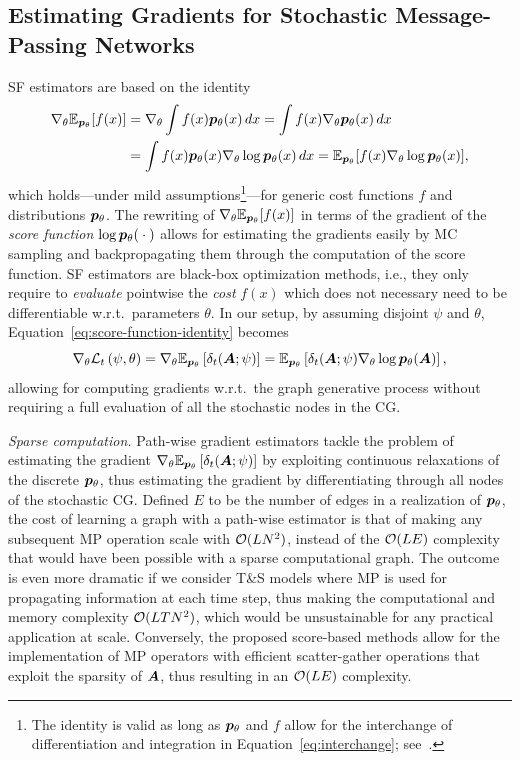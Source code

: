 \subsection{Estimating Gradients for Stochastic Message-Passing Networks}\label{s:smp}

SF estimators are based on the identity 
\begin{align}
\nabla_\theta\mathbb{E}_{{{\bm{p}}_\theta}}[f(x)] &= \nabla_\theta \int f(x) {{\bm{p}}_\theta}(x) \,d x = \int f(x) \nabla_\theta {{\bm{p}}_\theta}(x) \,d x\label{eq:interchange}\\ 
&=\int f(x) {{\bm{p}}_\theta}(x) \nabla_\theta\log{{\bm{p}}_\theta}(x) \,d x=\mathbb{E}_{{{\bm{p}}_\theta}}[f(x)\nabla_\theta \log {{\bm{p}}_\theta}(x)],\label{eq:score-function-identity}
\end{align}
which holds---under mild assumptions\footnote{The identity is valid as long as ${{\bm{p}}_\theta}$ and $f$ allow for the interchange of differentiation and integration in Equation~\eqref{eq:interchange}; see~\citet{l1995note, mohamed2020monte}.}---for generic cost functions $f$ and distributions ${{\bm{p}}_\theta}$. The rewriting of $\nabla_\theta\mathbb{E}_{{{\bm{p}}_\theta}}[f(x)]$ in terms of the gradient of the \emph{score function} $\log{{\bm{p}}_\theta}({}\cdot{})$ allows for estimating the gradients easily by MC sampling and backpropagating them through the computation of the score function. SF estimators are black-box optimization methods, i.e.,  they only require to \emph{evaluate} pointwise the \emph{cost} $f(x)$ which does not necessary need to be differentiable w.r.t.\ parameters $\theta$. In our setup, by assuming disjoint $\psi$ and $\theta$, Equation~\eqref{eq:score-function-identity} becomes
\begin{equation}\label{eq:score-function-identity-graph}
\nabla_\theta\mathcal{L}_t\left(\psi,\theta\right) 
= \nabla_\theta\mathbb{E}_{{{\bm{p}}_\theta}}\left[\delta_t({\bm{A}};\psi)\right] = \mathbb{E}_{{{\bm{p}}_\theta}}\left[\delta_t({\bm{A}};\psi)\nabla_\theta \log {{\bm{p}}_\theta}({\bm{A}})\right],
\end{equation} 
allowing for computing gradients w.r.t.\ the graph generative process without requiring a full evaluation of all the stochastic nodes in the CG. 

\textit{Sparse computation.} Path-wise gradient estimators tackle the problem of estimating the gradient $\nabla_\theta\mathbb{E}_{{{\bm{p}}_\theta}}\left[\delta_t({\bm{A}};\psi)\right]$ by exploiting continuous relaxations of the discrete ${{\bm{p}}_\theta}$, thus estimating the gradient by differentiating through all nodes of the stochastic CG.
Defined $E$ to be the number of edges in a realization of ${{\bm{p}}_\theta}$, the cost of learning a graph with a path-wise estimator is that of making any subsequent MP operation scale with $\mathcal{O}(LN^2)$, instead of the $\mathcal{O}(LE)$ complexity that would have been possible with a sparse computational graph. The outcome is even more dramatic if we consider T\&S models where MP is used for propagating information at each time step, thus making the computational and memory complexity $\mathcal{O}(LTN^2)$, which would be unsustainable for any practical application at scale. Conversely, the proposed score-based methods allow for the implementation of MP operators with efficient scatter-gather operations that exploit the sparsity of ${\bm{A}}$, thus resulting in an $\mathcal{O}(LE)$ complexity.

